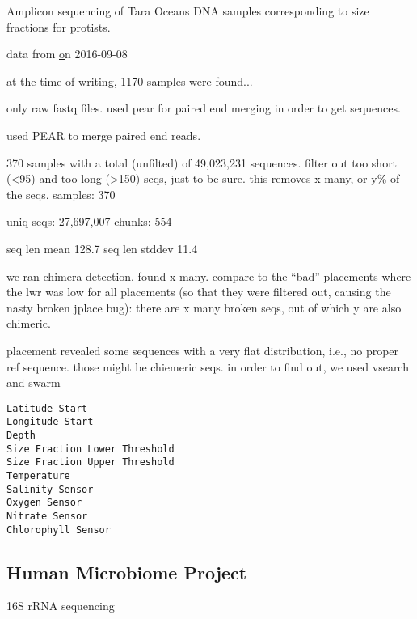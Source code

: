 
Amplicon sequencing of Tara Oceans DNA samples corresponding to size fractions for protists.

data from \href{https://www.ebi.ac.uk/ena/data/view/PRJEB6610}
on 2016-09-08

at the time of writing, 1170 samples were found...



only raw fastq files. used pear for paired end merging in order to get sequences.

used PEAR \cite{Zhang2014} to merge paired end reads.

370 samples with a total (unfilted) of 49,023,231 sequences.
filter out too short (<95) and too long (>150) seqs, just to be sure.
this removes x many, or y\% of the seqs.
samples: 370

uniq seqs: 27,697,007
chunks: 554

seq len mean 128.7
seq len stddev 11.4

we ran chimera detection. found x many.
compare to the ``bad'' placements where the lwr was low for all placements
(so that they were filtered out, causing the nasty broken jplace bug):
there are x many broken seqs, out of which y are also chimeric.

placement revealed some sequences with a very flat distribution, i.e., no proper ref sequence.
those might be chiemeric seqs. in order to find out, we used vsearch and swarm

\begin{verbatim}
Latitude Start
Longitude Start
Depth
Size Fraction Lower Threshold
Size Fraction Upper Threshold
Temperature
Salinity Sensor
Oxygen Sensor
Nitrate Sensor
Chlorophyll Sensor
\end{verbatim}


\subsection{Human Microbiome Project}
\label{sec:MetagenomicDatasets:sub:HumanMicrobiomeProject}

16S rRNA sequencing

